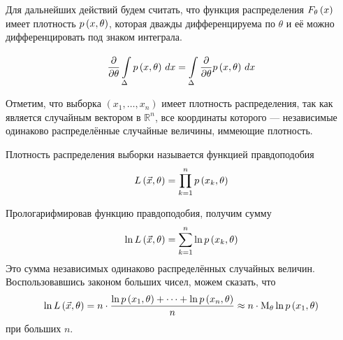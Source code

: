 \begin{remark}\label{remark:doubleDiff}
  Для дальнейших действий будем считать, что функция распределения
  $\cdfof{\theta}{x}$ имеет плотность $\pdf{x,\theta}$,
  которая дважды дифференцируема по $\theta$ и её можно дифференцировать под
  знаком интеграла.\footnotemark

  \begin{equation*}
    \frac{\partial}{\partial \theta}\integrall{\Delta}{dx}{\pdf{x, \theta}}
    = \integrall{\Delta}{dx}{\frac{\partial}{\partial \theta}\pdf{x, \theta}}
  \end{equation*}
\end{remark}


Отметим, что выборка $\left( x_1, \dots, x_n \right)$ имеет плотность
распределения, так как является случайным вектором в $\mathbb{R}^n$,
все координаты которого --- независимые одинаково распределённые случайные
величины, иммеющие плотность.

\begin{definition}
  \label{def:likehoodFunction}
  Плотность распределения выборки называется функцией правдоподобия
  \begin{equation*}
    L\left( \vec{x}, \theta \right) = \prod_{k=1}^n \pdf{x_k, \theta}
  \end{equation*}
\end{definition}

Прологарифмировав функцию правдоподобия, получим сумму
\begin{equation*}
  \ln{L\left( \vec{x}, \theta \right)}
  = \sum_{k=1}^n \ln{\pdf{x_k, \theta}}
\end{equation*}
Это сумма независимых одинаково распределённых случайных величин.
Воспользовавшись законом больших чисел, можем сказать,
что
\begin{equation*}
  \ln{L\left( \vec{x}, \theta \right)}
  = n \cdot \frac{\ln{\pdf{x_1, \theta}} + \dots + \ln{\pdf{x_n, \theta}}}{n}
  \approx n \cdot \meanof{\theta}{\ln{\pdf{x_1, \theta}}}
\end{equation*}
при больших $n$.


